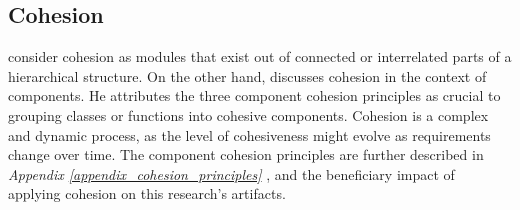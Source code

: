 \subsection{Cohesion} \label{subsubsec_on_cohesion}

\textcite[22]{mannaert_normalized_2016} consider cohesion as modules that exist out of
connected or interrelated parts of a hierarchical structure. On the other hand,
\textcite[118]{robert_c_martin_clean_2018} discusses cohesion in the context of
components. He attributes the three component cohesion principles as crucial to grouping
classes or functions into cohesive components. Cohesion is a complex and dynamic process,
as the level of cohesiveness might evolve as requirements change over time. The component
cohesion principles are further described in \textit{Appendix
\ref{appendix_cohesion_principles} }, and the
beneficiary impact of applying cohesion on this research’s artifacts.